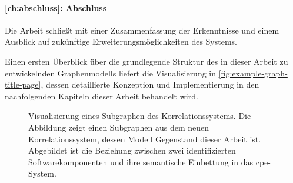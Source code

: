 \paragraph{\autoref{ch:abschluss}: Abschluss}
Die Arbeit schließt mit einer Zusammenfassung der Erkenntnisse und einem Ausblick auf zukünftige Erweiterungsmöglichkeiten des Systems.

\bigskip

Einen ersten Überblick über die grundlegende Struktur des in dieser Arbeit zu entwickelnden Graphenmodells liefert die Visualisierung in \autoref{fig:example-graph-title-page}, dessen detaillierte Konzeption und Implementierung in den nachfolgenden Kapiteln dieser Arbeit behandelt wird.

\clearpage
\thispagestyle{empty}
\vspace*{\fill}
\begin{figure}[h!]
    \centering
    \makebox[\textwidth]{}
    \caption{Visualisierung eines Subgraphen des Korrelationssystems. Die Abbildung zeigt einen Subgraphen aus dem neuen Korrelationssystem, dessen Modell Gegenstand dieser Arbeit ist. Abgebildet ist die Beziehung zwischen zwei identifizierten Softwarekomponenten und ihre semantische Einbettung in das \acrshort{cpe}-System.}
    \label{fig:example-graph-title-page}
\end{figure}
\vspace*{\fill}
\clearpage
